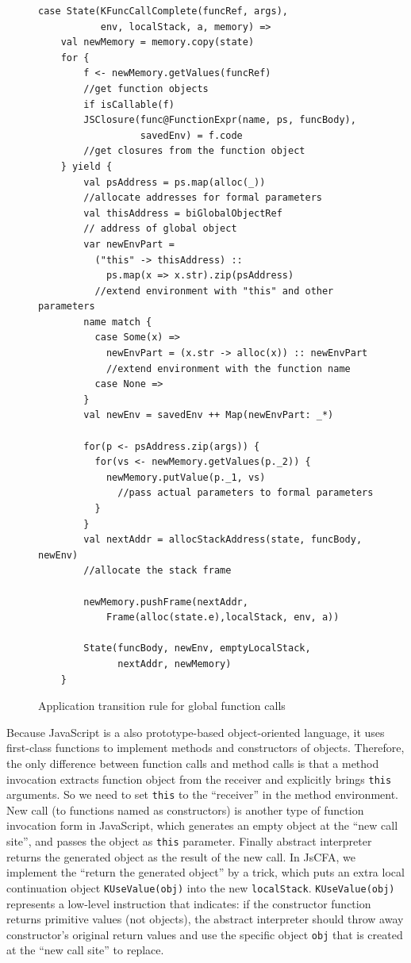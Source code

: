 \documentclass[12pt]{report}
\begin{document}
\begin{figure}
  \lstset{language=Scala}
  \begin{lstlisting}
case State(KFuncCallComplete(funcRef, args),
           env, localStack, a, memory) =>
    val newMemory = memory.copy(state)
    for {
        f <- newMemory.getValues(funcRef)
        //get function objects
        if isCallable(f)
        JSClosure(func@FunctionExpr(name, ps, funcBody),
                  savedEnv) = f.code
        //get closures from the function object
    } yield {
        val psAddress = ps.map(alloc(_))
        //allocate addresses for formal parameters
        val thisAddress = biGlobalObjectRef
        // address of global object
        var newEnvPart =
          ("this" -> thisAddress) ::
            ps.map(x => x.str).zip(psAddress)
          //extend environment with "this" and other parameters
        name match {
          case Some(x) =>
            newEnvPart = (x.str -> alloc(x)) :: newEnvPart
            //extend environment with the function name
          case None =>
        }
        val newEnv = savedEnv ++ Map(newEnvPart: _*)

        for(p <- psAddress.zip(args)) {
          for(vs <- newMemory.getValues(p._2)) {
            newMemory.putValue(p._1, vs)
              //pass actual parameters to formal parameters
          }
        }
        val nextAddr = allocStackAddress(state, funcBody, newEnv)
        //allocate the stack frame

        newMemory.pushFrame(nextAddr,
            Frame(alloc(state.e),localStack, env, a))

        State(funcBody, newEnv, emptyLocalStack,
              nextAddr, newMemory)
    }

  \end{lstlisting}
  \caption{Application transition rule for global function calls}
\label{fig:app-call}
\end{figure}

Because JavaScript is a also prototype-based object-oriented language, it uses first-class functions to implement methods and constructors of objects.
Therefore, the only difference between function calls and method calls is that a method invocation extracts function object from the receiver and explicitly brings \verb|this| arguments. So we need to set \verb|this| to the ``receiver'' in the method environment.
New call (to functions named as constructors) is another type of function invocation form in JavaScript, which generates an empty object at the ``new call site'', and passes the object as \verb|this| parameter. Finally abstract interpreter returns the generated object as the result of the new call.
In JsCFA, we implement the ``return the generated object'' by a trick, which puts an extra local continuation object \verb|KUseValue(obj)| into the new \verb|localStack|.
\verb|KUseValue(obj)| represents a low-level instruction that indicates: if the constructor function returns primitive values (not objects), the abstract interpreter should throw away constructor's original return values and use the specific object \verb|obj| that is created at the ``new call site'' to replace.
\end{document}
